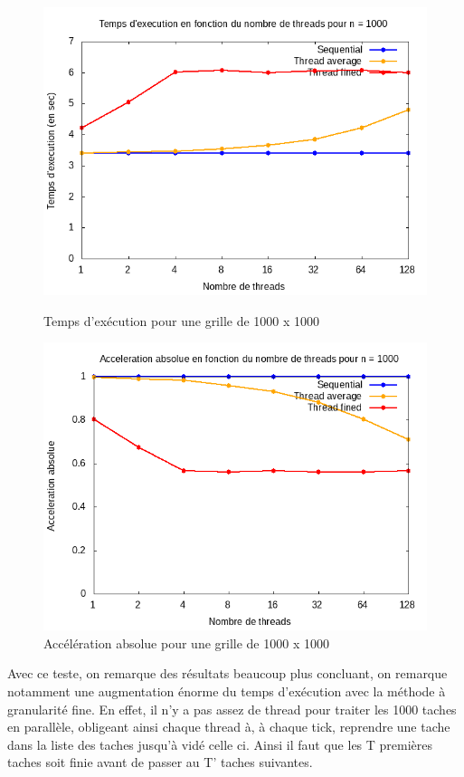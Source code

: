 \documentclass[10pt,a4paper]{article}
\begin{document}
\begin{figure}[h]
  \centering
  \begin{minipage}[b]{0.49\textwidth}
	\includegraphics[width=\textwidth]{./Time/size_1000_time.png}
    \caption{Temps d'exécution pour une grille de 1000 x 1000}
  \end{minipage}
  \hfill
  \begin{minipage}[b]{0.49\textwidth}
    \includegraphics[width=\textwidth]{./Time/size_1000_acceleration.png}
    \caption{Accélération absolue pour une grille de 1000 x 1000}
  \end{minipage}
\end{figure}

Avec ce teste, on remarque des résultats beaucoup plus concluant, on remarque notamment une augmentation énorme du temps d'exécution avec la méthode à granularité fine. En effet, il n'y a pas assez de thread pour traiter les 1000 taches en parallèle, obligeant ainsi chaque thread à, à chaque tick, reprendre une tache dans la liste des taches jusqu'à vidé celle ci. Ainsi il faut que les T premières taches soit finie avant de passer au T' taches suivantes.\\
\end{document}
